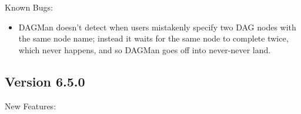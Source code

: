 \noindent Known Bugs:
\begin{itemize}

\item DAGMan doesn't detect when users mistakenly specify two
DAG nodes with the same node name; instead it waits for the
same node to complete twice, which never happens, and so DAGMan
goes off into never-never land.

\end{itemize}

\subsection{\label{sec:New-6-5-0}Version 6.5.0}
\noindent New Features:
